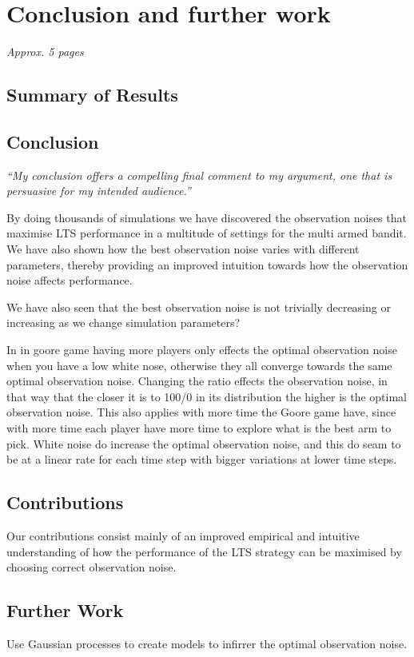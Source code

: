 \chapter{Conclusion and further work}
\label{ch:conclusion}
\textit{Approx. 5 pages}

\section{Summary of Results}

\section{Conclusion}
\emph{“My conclusion offers a compelling final comment to my argument, one that is persuasive for my intended audience.”}

By doing thousands of simulations we have discovered the observation noises that maximise LTS performance in a multitude of settings for the multi armed bandit.
We have also shown how the best observation noise varies with different parameters, thereby providing an improved intuition towards how the observation noise affects performance.

We have also seen that the best observation noise is not trivially decreasing or increasing as we change simulation parameters?

In in goore game having more players only effects the optimal observation noise when you have a low white nose,
otherwise they all converge towards the same optimal observation noise. Changing the ratio effects the observation
noise, in that way that the closer it is to 100/0 in its distribution the higher is the optimal observation noise.
This also applies with more time the Goore game have, since with more time each player have more time to explore
what is the best arm to pick. White noise do increase the optimal observation noise, and this do seam to be at a
linear rate for each time step with bigger variations at lower time steps.

\section{Contributions}
Our contributions consist mainly of an improved empirical and intuitive understanding of how the performance of the LTS strategy can be maximised by choosing correct observation noise.


\section{Further Work}
Use Gaussian processes to create models to infirrer the optimal observation noise.

